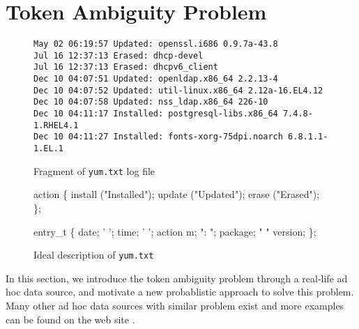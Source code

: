 \section{Token Ambiguity Problem} \label{sec:examples}
\begin{figure}[t]
\begin{center}
{\small
\begin{verbatim}
May 02 06:19:57 Updated: openssl.i686 0.9.7a-43.8
Jul 16 12:37:13 Erased: dhcp-devel
Jul 16 12:37:13 Erased: dhcpv6_client
Dec 10 04:07:51 Updated: openldap.x86_64 2.2.13-4
Dec 10 04:07:52 Updated: util-linux.x86_64 2.12a-16.EL4.12
Dec 10 04:07:58 Updated: nss_ldap.x86_64 226-10
Dec 10 04:11:17 Installed: postgresql-libs.x86_64 7.4.8-1.RHEL4.1
Dec 10 04:11:27 Installed: fonts-xorg-75dpi.noarch 6.8.1.1-1.EL.1
\end{verbatim}
}
\end{center}
\caption{Fragment of {\tt yum.txt} log file} \label{fig:yum}
\end{figure}

\begin{figure}[t]
\begin{minipage}[t]{0.5\columnwidth}
\begin{code}
 action \{
  install ("Installed");
  update ("Updated");
  erase ("Erased");
\};
\end{code}
\end{minipage}
\hfill
\begin{minipage}[t]{0.5\columnwidth}
\begin{code}
 entry_t \{
   date;
  ' ';
   time;
  ' ';
  action m;
  ": ";
   package;
  " "
   version;
\};
\end{code}
\end{minipage}
\caption{Ideal \pads{} description of {\tt yum.txt}}\label{fig:yum-gold}
\end{figure}


In this section, we introduce the token ambiguity problem through
a real-life ad hoc data source, and motivate a new probablistic approach
to solve this problem. Many other ad hoc data sources with similar
problem exist and more examples can be found on the \pads{} web site \cite{padsweb}.

